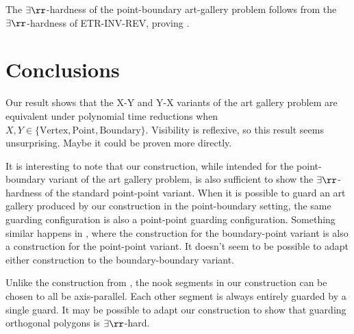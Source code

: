 The $\exists\rr$-hardness of the point-boundary art-gallery problem follows from the $\exists\rr$-hardness of ETR-INV-REV, proving .

\section{Conclusions}\label{Conclusion}

Our result shows that the X-Y and Y-X variants of the art gallery problem are equivalent under polynomial time reductions when $X, Y\in \{\text{Vertex}, \text{Point}, \text{Boundary}\}$. Visibility is reflexive, so this result seems unsurprising. Maybe it could be proven more directly.

It is interesting to note that our construction, while intended for the point-boundary variant of the art gallery problem, is also sufficient to show the $\exists\rr$-hardness of the standard point-point variant. When it is possible to guard an art gallery produced by our construction in the point-boundary setting, the same guarding configuration is also a point-point guarding configuration. Something similar happens in \cite{ExistsRHardness}, where the construction for the boundary-point variant is also a construction for the point-point variant. It doesn't seem to be possible to adapt either construction to the boundary-boundary variant.

Unlike the construction from \cite{ExistsRHardness}, the nook segments in our construction can be chosen to all be axis-parallel. Each other segment is always entirely guarded by a single guard. It may be possible to adapt our construction to show that guarding orthogonal polygons is $\exists\rr$-hard.

